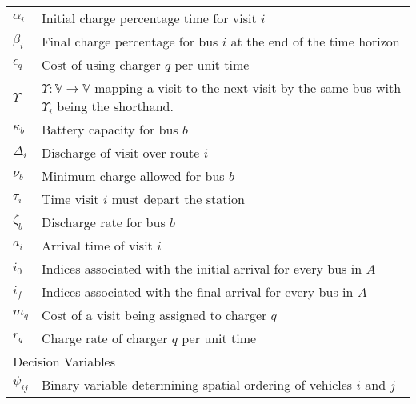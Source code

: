 \documentclass[utf8]{FrontiersinHarvard}
\begin{document}
\begin{table}[!htpb]
\begin{tabularx}{\textwidth}{l l}
    $\alpha_i$ & Initial charge percentage time for visit $i$                                                                   \\
    $\beta_i$ & Final charge percentage for bus $i$ at the end of the time horizon                                             \\
    $\epsilon_q$ & Cost of using charger $q$ per unit time                                                                        \\
    $\Upsilon$   & $\Upsilon: \mathbb{V} \rightarrow \mathbb{V}$ mapping a visit to the next visit by the same bus with $\Upsilon_i$ being the shorthand. \\
    $\kappa_b$ & Battery capacity for bus $b$                                                                                   \\
    $\Delta_i$ & Discharge of visit over route $i$                                                                              \\
    $\nu_b$ & Minimum charge allowed for bus $b$                                                                             \\
    $\tau_i$ & Time visit $i$ must depart the station                                                                         \\
    $\zeta_b$ & Discharge rate for bus $b$                                                                                     \\
    $a_i$ & Arrival time of visit  $i$                                                                                     \\
    $i_0$ & Indices associated with the initial arrival for every bus in $A$                                               \\
    $i_f$ & Indices associated with the final arrival for every bus in $A$                                                 \\
    $m_q$ & Cost of a visit being assigned to charger $q$                                                                  \\
    $r_q$ & Charge rate of charger $q$ per unit time                                                                       \\
    \hline
    \multicolumn{2}{l}{Decision Variables}                                                                                 \\
    $\psi_{ij}$ & Binary variable determining spatial ordering of vehicles $i$ and $j$                                       \\

\end{tabularx}
\end{table}
\end{document}
